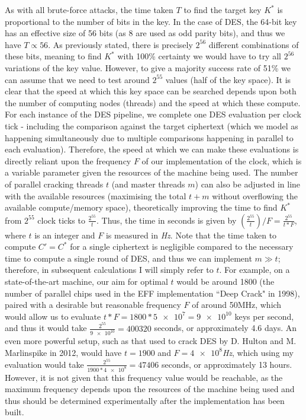 \documentclass[a4paper, 11pt]{article}
\begin{document}
As with all brute-force attacks, the time taken $T$ to find the target key $K^{*}$ is proportional to the number of bits in the key. In the case of DES, the 64-bit key has an effective size of 56 bits (as 8 are used as odd parity bits), and thus we have $T \propto 56$. As previously stated, there is precisely $2^{56}$ different combinations of these bits, meaning to find $K^{*}$ with 100\% certainty we would have to try all  $2^{56}$ variations of the key value. However, to give a majority success rate of 51\% we can assume that we need to test around $2^{55}$ values (half of the key space). It is clear that the speed at which this key space can be searched depends upon both the number of computing nodes (threads) and the speed at which these compute. For each instance of the DES pipeline, we complete one DES evaluation per clock tick - including the comparison against the target ciphertext (which we model as happening simultaneously due to multiple comparisons happening in parallel to each evaluation). Therefore, the speed at which we can make these evaluations is directly reliant upon the frequency $F$ of our implementation of the clock, which is a variable parameter given the resources of the machine being used. The number of parallel cracking threads $t$ (and master threads $m$) can also be adjusted in line with the available resources (maximising the total $t+m$ without overflowing the available compute/memory space), theoretically improving the time to find $K^{*}$ from $2^{55}$ clock ticks to $\frac{2^{55}}{t}$. Thus, the time in seconds is given by $(\frac{2^{55}}{t})/F = \frac{2^{55}}{t*F}$, where $t$ is an integer and $F$ is measured in \emph{Hz}. Note that the time taken to compute $C' = C^{*}$ for a single ciphertext is negligible compared to the necessary time to compute a single round of DES, and thus we can implement $m \gg t$; therefore, in subsequent calculations I will simply refer to $t$. For example, on a state-of-the-art machine, our aim for optimal $t$ would be around 1800 (the number of parallel chips used in the EFF implementation ``Deep Crack" in 1998), paired with a desirable but reasonable frequency $F$ of around 50MHz, which would allow us to evaluate $t * F = 1800 * \num{5e7} = \num{9e10}$ keys per second, and thus it would take $\frac{2^{55}}{\num{9e10}} = 400320$ seconds, or approximately 4.6 days. An even more powerful setup, such as that used to crack DES by D. Hulton and M. Marlinspike in 2012, would have $t = 1900$ and $F = \num{4e8}$\emph{Hz}, which using my evaluation would take $\frac{2^{55}}{1900 * \num{4e8}} = 47406$ seconds, or approximately 13 hours. However, it is not given that this frequency value would be reachable, as the maximum frequency depends upon the resources of the machine being used and thus should be determined experimentally after the implementation has been built.
\end{document}
